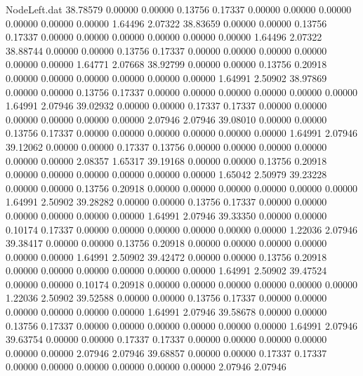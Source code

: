 \begin{filecontents}{NodeLeft.dat}
  38.78579    0.00000    0.00000     0.13756    0.17337    0.00000    0.00000    0.00000    0.00000    0.00000    0.00000    1.64496    2.07322
  38.83659    0.00000    0.00000     0.13756    0.17337    0.00000    0.00000    0.00000    0.00000    0.00000    0.00000    1.64496    2.07322
  38.88744    0.00000    0.00000     0.13756    0.17337    0.00000    0.00000    0.00000    0.00000    0.00000    0.00000    1.64771    2.07668
  38.92799    0.00000    0.00000     0.13756    0.20918    0.00000    0.00000    0.00000    0.00000    0.00000    0.00000    1.64991    2.50902
  38.97869    0.00000    0.00000     0.13756    0.17337    0.00000    0.00000    0.00000    0.00000    0.00000    0.00000    1.64991    2.07946
  39.02932    0.00000    0.00000     0.17337    0.17337    0.00000    0.00000    0.00000    0.00000    0.00000    0.00000    2.07946    2.07946
  39.08010    0.00000    0.00000     0.13756    0.17337    0.00000    0.00000    0.00000    0.00000    0.00000    0.00000    1.64991    2.07946
  39.12062    0.00000    0.00000     0.17337    0.13756    0.00000    0.00000    0.00000    0.00000    0.00000    0.00000    2.08357    1.65317
  39.19168    0.00000    0.00000     0.13756    0.20918    0.00000    0.00000    0.00000    0.00000    0.00000    0.00000    1.65042    2.50979
  39.23228    0.00000    0.00000     0.13756    0.20918    0.00000    0.00000    0.00000    0.00000    0.00000    0.00000    1.64991    2.50902
  39.28282    0.00000    0.00000     0.13756    0.17337    0.00000    0.00000    0.00000    0.00000    0.00000    0.00000    1.64991    2.07946
  39.33350    0.00000    0.00000     0.10174    0.17337    0.00000    0.00000    0.00000    0.00000    0.00000    0.00000    1.22036    2.07946
  39.38417    0.00000    0.00000     0.13756    0.20918    0.00000    0.00000    0.00000    0.00000    0.00000    0.00000    1.64991    2.50902
  39.42472    0.00000    0.00000     0.13756    0.20918    0.00000    0.00000    0.00000    0.00000    0.00000    0.00000    1.64991    2.50902
  39.47524    0.00000    0.00000     0.10174    0.20918    0.00000    0.00000    0.00000    0.00000    0.00000    0.00000    1.22036    2.50902
  39.52588    0.00000    0.00000     0.13756    0.17337    0.00000    0.00000    0.00000    0.00000    0.00000    0.00000    1.64991    2.07946
  39.58678    0.00000    0.00000     0.13756    0.17337    0.00000    0.00000    0.00000    0.00000    0.00000    0.00000    1.64991    2.07946
  39.63754    0.00000    0.00000     0.17337    0.17337    0.00000    0.00000    0.00000    0.00000    0.00000    0.00000    2.07946    2.07946
  39.68857    0.00000    0.00000     0.17337    0.17337    0.00000    0.00000    0.00000    0.00000    0.00000    0.00000    2.07946    2.07946

\end{filecontents}
